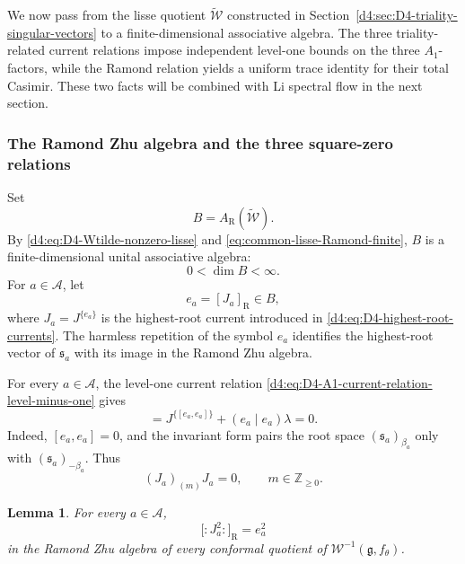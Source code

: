 \documentclass[11pt,reqno]{amsart}
\newtheorem{lemma}[theorem]{Lemma}
\theoremstyle{definition}
\theoremstyle{remark}
\begin{document}
We now pass from the lisse quotient
\(\widetilde{\mathcal W}\) constructed in
Section~\ref{d4:sec:D4-triality-singular-vectors} to a finite-dimensional
associative algebra.  The three triality-related current relations impose
independent level-one bounds on the three \(A_1\)-factors, while the
Ramond relation yields a uniform trace identity for their total Casimir.
These two facts will be combined with Li spectral flow in the next
section.

\subsubsection{The Ramond Zhu algebra and the three square-zero relations}


Set
\begin{equation*}
  B=A_{\mathrm R}(\widetilde{\mathcal W}).
\end{equation*}
By \eqref{d4:eq:D4-Wtilde-nonzero-lisse} and
\eqref{eq:common-lisse-Ramond-finite}, \(B\) is a finite-dimensional
unital associative algebra:
\begin{equation}
  0<\dim B<\infty.
  \label{d4:eq:D4-Ramond-Zhu-B-finite}
\end{equation}
For \(a\in\mathcal A\), let
\begin{equation*}
  e_a=[J_a]_{\mathrm R}\in B,
\end{equation*}
where \(J_a=J^{\{e_a\}}\) is the highest-root current introduced in
\eqref{d4:eq:D4-highest-root-currents}.  The harmless repetition of the
symbol \(e_a\) identifies the highest-root vector of \(\mathfrak s_a\)
with its image in the Ramond Zhu algebra.

For every \(a\in\mathcal A\), the level-one current relation
\eqref{d4:eq:D4-A1-current-relation-level-minus-one} gives
\begin{equation*}
  [J_a{}_{\lambda}J_a]
  =J^{\{[e_a,e_a]\}}+(e_a\mid e_a)\lambda=0.
\end{equation*}
Indeed, \([e_a,e_a]=0\), and the invariant form pairs the root space
\((\mathfrak s_a)_{\beta_a}\) only with
\((\mathfrak s_a)_{-\beta_a}\).  Thus
\begin{equation}
  (J_a)_{(m)}J_a=0,
  \qquad m\in\mathbb Z_{\ge0}.
  \label{d4:eq:D4-highest-root-current-products-zero}
\end{equation}

\begin{lemma}
\label{d4:lem:D4-Zhu-image-current-square}
For every \(a\in\mathcal A\),
\begin{equation*}
  \bigl[:J_a^2:\bigr]_{\mathrm R}=e_a^2
\end{equation*}
in the Ramond Zhu algebra of every conformal quotient of
\(\mathcal W^{-1}(\mathfrak g,f_\theta)\).
\end{lemma}
\end{document}
